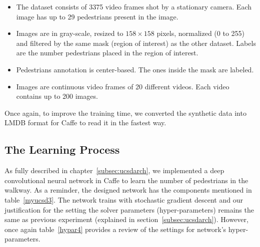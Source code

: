 \begin{itemize}
\item The dataset consists of 3375 video frames shot by a stationary camera. Each image has up to 29 pedestrians present in the image.
\item Images are in gray-scale, resized to $158\times158$ pixels, normalized (0 to 255) and filtered by the same mask (region of interest) as the other dataset. Labels are the number pedestrians placed in the region of interest.
\item Pedestrians annotation is center-based. The ones inside the mask are labeled.  
\item Images are continuous video frames of 20 different videos. Each video contains up to 200 images.  
\end{itemize}

Once again, to improve the training time, we converted the synthetic data into LMDB format for Caffe to read it in the fastest way.


\subsection{The Learning Process}

As fully described in chapter~\ref{subsec:ucsdarch}, we implemented a deep convolutional neural network in Caffe to learn the number of pedestrians in the walkway. As a reminder, the designed network has the components mentioned in table~\ref{myucsd3}. The network trains with stochastic gradient descent and our justification for the setting the solver parameters (hyper-parameters) remains the same as previous experiment (explained in section~\ref{subsec:ucsdarch}). However, once again table~\ref{hypar4} provides a review of the settings for network's hyper-parameters.

